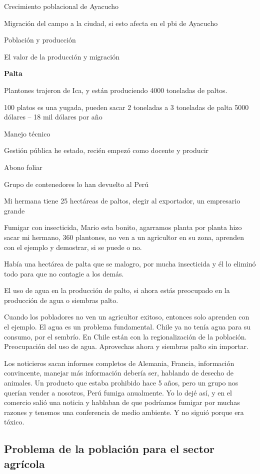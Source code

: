 \documentclass[
  letterpaper,
  DIV=11,
  numbers=noendperiod]{scrartcl}
\begin{document}
Crecimiento poblacional de Ayacucho

Migración del campo a la ciudad, si esto afecta en el pbi de Ayacucho

Población y producción

El valor de la producción y migración

\textbf{Palta}

Plantones trajeron de Ica, y están produciendo 4000 toneladas de paltos.

100 platos es una yugada, pueden sacar 2 toneladas a 3 toneladas de
palta 5000 dólares -- 18 mil dólares por año

Manejo técnico

Gestión pública he estado, recién empezó como docente y producir

Abono foliar

Grupo de contenedores lo han devuelto al Perú

Mi hermana tiene 25 hectáreas de paltos, elegir al exportador, un
empresario grande

Fumigar con insecticida, Mario esta bonito, agarramos planta por planta
hizo sacar mi hermano, 360 plantones, no ven a un agricultor en su zona,
aprenden con el ejemplo y demostrar, si se puede o no.

Había una hectárea de palta que se malogro, por mucha insecticida y él
lo eliminó todo para que no contagie a los demás.

El uso de agua en la producción de palto, si ahora estás preocupado en
la producción de agua o siembras palto.

Cuando los pobladores no ven un agricultor exitoso, entonces solo
aprenden con el ejemplo. El agua es un problema fundamental. Chile ya no
tenía agua para su consumo, por el sembrío. En Chile están con la
regionalización de la población. Preocupación del uso de agua.
Aprovechas ahora y siembras palto sin importar.

Los noticieros sacan informes completos de Alemania, Francia,
información convincente, manejar más información debería ser, hablando
de desecho de animales. Un producto que estaba prohibido hace 5 años,
pero un grupo nos querían vender a nosotros, Perú fumiga anualmente. Yo
lo dejé así, y en el comercio salió una noticia y hablaban de que
podríamos fumigar por muchas razones y tenemos una conferencia de medio
ambiente. Y no siguió porque era tóxico.

\hypertarget{problema-de-la-poblaciuxf3n-para-el-sector-agruxedcola}{%
\subsection{Problema de la población para el sector
agrícola}\label{problema-de-la-poblaciuxf3n-para-el-sector-agruxedcola}}
\end{document}
